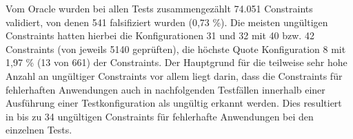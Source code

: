 Vom Oracle wurden bei allen Tests zusammengezählt 74.051 Constraints validiert, von denen 541 falsifiziert wurden (0,73 \%).
Die meisten ungültigen Constraints hatten hierbei die Konfigurationen 31 und 32 mit 40 bzw. 42 Constraints (von jeweils 5140 geprüften), die höchste Quote Konfiguration 8 mit 1,97 \% (13 von 661) der Constraints.
Der Hauptgrund für die teilweise sehr hohe Anzahl an ungültiger Constraints vor allem liegt darin, dass die Constraints für fehlerhaften Anwendungen auch in nachfolgenden Testfällen innerhalb einer Ausführung einer Testkonfiguration als ungültig erkannt werden.
Dies resultiert in bis zu 34 ungültigen Constraints für fehlerhafte Anwendungen bei den einzelnen Tests.
